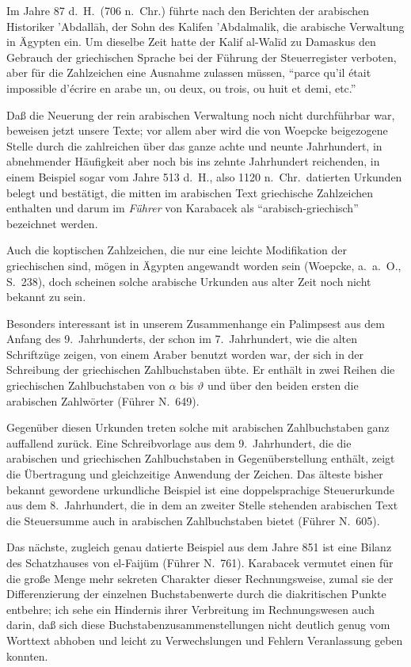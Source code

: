 \documentclass[11pt,a4paper]{article}
\newcommand{\enquote}[1]{``#1''}
\begin{document}
Im Jahre 87 d.\ H.\ (706 n.\ Chr.) f\"uhrte nach den Berichten der arabischen Historiker 'Abdall\=ah, der Sohn des Kalifen 'Abdalmalik, die arabische Verwaltung in \"Agypten ein. Um dieselbe Zeit hatte der Kalif al-Wal\={i}d zu Damaskus den Gebrauch der griechischen Sprache bei der F\"uhrung der Steuerregister verboten, aber f\"ur die Zahlzeichen eine Ausnahme zulassen m\"ussen, \enquote{parce qu'il \'etait impossible d'\'ecrire en arabe un, ou deux, ou trois, ou huit et demi, etc.}

Da\ss{} die Neuerung der rein arabischen Verwaltung noch nicht durchf\"uhrbar war, beweisen jetzt unsere Texte; vor allem aber wird die von Woepcke beigezogene Stelle durch die zahlreichen \"uber das ganze achte und neunte Jahrhundert, in abnehmender H\"aufigkeit aber noch bis ins zehnte Jahrhundert reichenden, in einem Beispiel sogar vom Jahre 513 d.\ H., also 1120 n.\ Chr.\ datierten Urkunden belegt und best\"atigt, die mitten im arabischen Text griechische Zahlzeichen enthalten und darum im \textit{F\"uhrer} von Karabacek als \enquote{arabisch-griechisch} bezeichnet werden.

Auch die koptischen Zahlzeichen, die nur eine leichte Modifikation der griechischen sind, m\"ogen in \"Agypten angewandt worden sein (Woepcke, a.\ a.\ O., S.\ 238), doch scheinen solche arabische Urkunden aus alter Zeit noch nicht bekannt zu sein.

Besonders interessant ist in unserem Zusammenhange ein Palimpsest aus dem Anfang des 9.\ Jahrhunderts, der schon im 7.\ Jahrhundert, wie die alten Schriftz\"uge zeigen, von einem Araber benutzt worden war, der sich in der Schreibung der griechischen Zahlbuchstaben \"ubte. Er enth\"alt in zwei Reihen die griechischen Zahlbuchstaben von $\alpha$ bis $\vartheta$ und \"uber den beiden ersten die arabischen Zahlw\"orter (F\"uhrer N.\ 649).

Gegen\"uber diesen Urkunden treten solche mit arabischen Zahlbuchstaben ganz auffallend zur\"uck. Eine Schreibvorlage aus dem 9.\ Jahrhundert, die die arabischen und griechischen Zahlbuchstaben in Gegen\"uberstellung enth\"alt, zeigt die \"Ubertragung und gleichzeitige Anwendung der Zeichen. Das \"alteste bisher bekannt gewordene urkundliche Beispiel ist eine doppelsprachige Steuerurkunde aus dem 8.\ Jahrhundert, die in dem an zweiter Stelle stehenden arabischen Text die Steuersumme auch in arabischen Zahlbuchstaben bietet (F\"uhrer N.\ 605).

Das n\"achste, zugleich genau datierte Beispiel aus dem Jahre 851 ist eine Bilanz des Schatzhauses von el-Faij\"um (F\"uhrer N.\ 761). Karabacek vermutet einen f\"ur die gro\ss{}e Menge mehr sekreten Charakter dieser Rechnungsweise, zumal sie der Differenzierung der einzelnen Buchstabenwerte durch die diakritischen Punkte entbehre; ich sehe ein Hindernis ihrer Verbreitung im Rechnungswesen auch darin, da\ss{} sich diese Buchstabenzusammenstellungen nicht deutlich genug vom Worttext abhoben und leicht zu Verwechslungen und Fehlern Veranlassung geben konnten.
\end{document}
